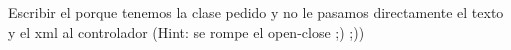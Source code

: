 Escribir el porque tenemos la clase pedido y no le pasamos directamente el texto y el xml al controlador (Hint: se rompe el open-close ;) ;))